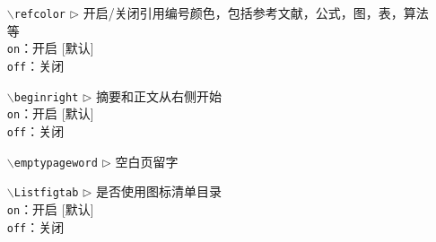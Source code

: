 \begin{itemize}[leftmargin=3cm]
	\item[{\tt  $\backslash$refcolor} $\triangleright$]  开启/关闭引用编号颜色，包括参考文献，公式，图，表，算法等\\
	\texttt{on}：开启 [默认]\\
	\texttt{off}：关闭
	\item[{\tt $\backslash$beginright} $\triangleright$]  摘要和正文从右侧开始\\
	\texttt{on}：开启 [默认]\\
	\texttt{off}：关闭
	\item[{\tt $\backslash$emptypageword} $\triangleright$]  空白页留字
	\item[{\tt $\backslash$Listfigtab} $\triangleright$]  是否使用图标清单目录\\
	\texttt{on}：开启 [默认]\\
	\texttt{off}：关闭
\end{itemize}


